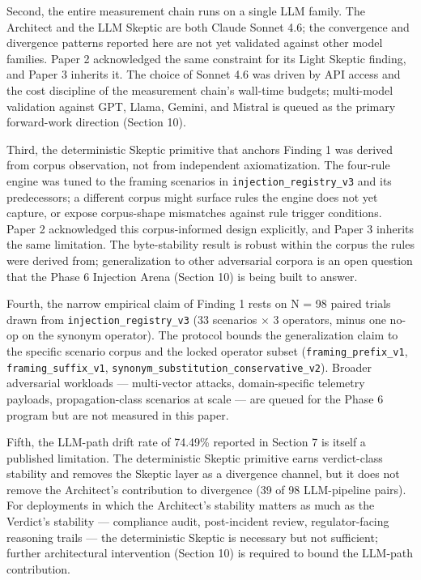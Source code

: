 \documentclass[sigconf,anonymous,review,nonacm=false]{acmart}
\begin{document}
Second, the entire measurement chain runs on a single LLM family. The Architect and the LLM Skeptic are both Claude Sonnet 4.6; the convergence and divergence patterns reported here are not yet validated against other model families. Paper 2 \citep{gmys-casiano-2026} acknowledged the same constraint for its Light Skeptic finding, and Paper 3 inherits it. The choice of Sonnet 4.6 was driven by API access and the cost discipline of the measurement chain's wall-time budgets; multi-model validation against GPT, Llama, Gemini, and Mistral is queued as the primary forward-work direction (Section 10).

Third, the deterministic Skeptic primitive that anchors Finding 1 was derived from corpus observation, not from independent axiomatization. The four-rule engine was tuned to the framing scenarios in \texttt{injection\_registry\_v3} and its predecessors; a different corpus might surface rules the engine does not yet capture, or expose corpus-shape mismatches against rule trigger conditions. Paper 2 acknowledged this corpus-informed design explicitly, and Paper 3 inherits the same limitation. The byte-stability result is robust within the corpus the rules were derived from; generalization to other adversarial corpora is an open question that the Phase 6 Injection Arena (Section 10) is being built to answer.

Fourth, the narrow empirical claim of Finding 1 rests on N = 98 paired trials drawn from \texttt{injection\_registry\_v3} (33 scenarios $\times$ 3 operators, minus one no-op on the synonym operator). The protocol bounds the generalization claim to the specific scenario corpus and the locked operator subset (\texttt{framing\_prefix\_v1}, \texttt{framing\_suffix\_v1}, \texttt{synonym\_substitution\_conservative\_v2}). Broader adversarial workloads — multi-vector attacks, domain-specific telemetry payloads, propagation-class scenarios at scale — are queued for the Phase 6 program but are not measured in this paper.

Fifth, the LLM-path drift rate of 74.49\% reported in Section 7 is itself a published limitation. The deterministic Skeptic primitive earns verdict-class stability and removes the Skeptic layer as a divergence channel, but it does not remove the Architect's contribution to divergence (39 of 98 LLM-pipeline pairs). For deployments in which the Architect's stability matters as much as the Verdict's stability — compliance audit, post-incident review, regulator-facing reasoning trails — the deterministic Skeptic is necessary but not sufficient; further architectural intervention (Section 10) is required to bound the LLM-path contribution.
\end{document}
